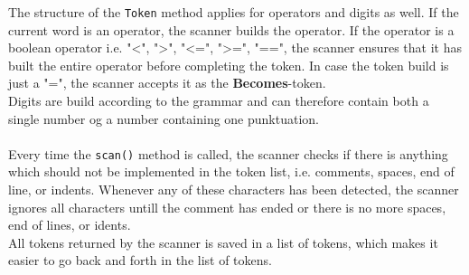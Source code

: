 The structure of the \texttt{Token} method applies for operators and digits as well. If the current word is an operator, the scanner builds the operator. If the operator is a boolean operator i.e. "<", ">", "<=", ">=", "==", the scanner ensures that it has built the entire operator before completing the token. In case the token build is just a "=", the scanner accepts it as the \textbf{Becomes}-token.\\
Digits are build according to the grammar and can therefore contain both a single number og a number containing one punktuation.\\
\\
Every time the \texttt{scan()} method is called, the scanner checks if there is anything which should not be implemented in the token list, i.e. comments, spaces, end of line, or indents. Whenever any of these characters has been detected, the scanner ignores all characters untill the comment has ended or there is no more spaces, end of lines, or idents.\\
All tokens returned by the scanner is saved in a list of tokens, which makes it easier to go back and forth in the list of tokens.\\
